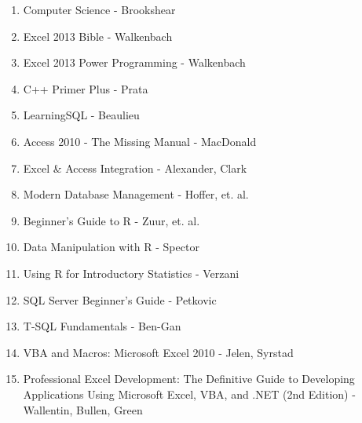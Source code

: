 \documentclass[oneside, titlepage]{article}
\begin{document}
\begin{enumerate}
\item{Computer Science - Brookshear}
\item{Excel 2013 Bible - Walkenbach}
\item{Excel 2013 Power Programming - Walkenbach}
\item{C++ Primer Plus - Prata}
\item{LearningSQL - Beaulieu}
\item{Access 2010 - The Missing Manual - MacDonald}
\item{Excel \& Access Integration - Alexander, Clark}
\item{Modern Database Management - Hoffer, et. al.}
\item{Beginner's Guide to R - Zuur, et. al.}
\item{Data Manipulation with R - Spector}
\item{Using R for Introductory Statistics - Verzani}
\item{SQL Server Beginner's Guide - Petkovic}
\item{T-SQL Fundamentals - Ben-Gan}
\item{VBA and Macros: Microsoft Excel 2010 - Jelen, Syrstad}
\item{Professional Excel Development: The Definitive Guide to Developing Applications Using Microsoft Excel, VBA, and .NET (2nd Edition) - Wallentin, Bullen, Green}
\end{enumerate}
\end{document}
